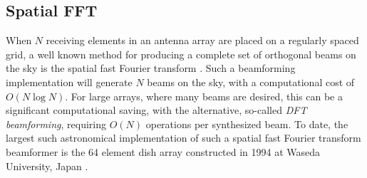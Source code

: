 \documentclass[useAMS,macros,usenatbib,onecolumn]{mn2e}
\begin{document}
%
%
%

\subsection{Spatial FFT}
\label{s-engine}
 
When $N$ receiving elements in an antenna array are placed on a regularly spaced grid, a well known method for producing a complete set of orthogonal beams on the sky is the spatial fast Fourier transform \citep{fastbeamforming}.
Such a beamforming implementation will generate $N$ beams on the sky, with a computational cost of $O(N\log{N})$. For large arrays, where many beams are desired, this can be a significant computational saving, with the alternative, so-called \emph{DFT beamforming}, requiring $O(N)$ operations per synthesized beam.
To date, the largest such astronomical implementation of such a spatial fast Fourier transform beamformer is the 64 element dish array constructed in 1994 at Waseda University, Japan \citep{2dfft}.
\end{document}
